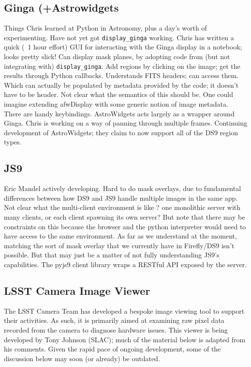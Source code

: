 \subsection{Ginga (+Astrowidgets}
Things Chris learned at Python in Astronomy, plus a day's worth of experimenting.
Have not yet got \texttt{display\_ginga} working.
Chris has written a quick (~1 hour effort) GUI for interacting with the Ginga display in a notebook; looks pretty slick!
Can display mask planes, by adopting code from (but not integrating with) \texttt{display\_ginga}.
Add regions by clicking on the image; get the results through Python callbacks.
Understands FITS headers; can access them.
Which can actually be populated by metadata provided by the code; it doesn't have to be header.
Not clear what the semantics of this should be.
One could imagine extending afwDisplay with some generic notion of image metadata.
There are handy keybindings.
AstroWidgets acts largely as a wrapper around Ginga.
Chris is working on a way of panning through multiple frames.
Continuing development of AstroWidgets; they claim to now support all of the DS9 region types.

\subsection{JS9}

Eric Mandel actively developing.
Hard to do mask overlays, due to fundamental differences between how DS9 and JS9 handle multiple images in the same app.
Not clear what the multi-client environment is like ? one monolithic server with many clients, or each client spawning its own server?
But note that there may be constraints on this because the browser and the python interpreter would need to have access to the same environment.
As far as we understand at the moment, matching the sort of mask overlay that we currently have in Firefly/DS9 isn't possible.
But that may just be a matter of not fully understanding JS9's capabilities.
The pyjs9 client library wraps a RESTful API exposed by the server.


\subsection{LSST Camera Image Viewer}

The LSST Camera Team has developed a bespoke image viewing tool to support their activities.
As such, it is primarily aimed at examining raw pixel data recorded from the camera to diagnose hardware issues.
This viewer is being developed by Tony Johnson (SLAC); much of the material below is adapted from his comments.
Given the rapid pace of ongoing development, some of the discussion below may soon (or already) be outdated.

